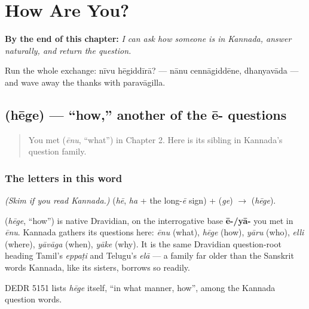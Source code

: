 
\chapter{How Are You?}
\label{ch:responding}

\begin{chapteropening}
\textbf{By the end of this chapter:} \emph{I can ask how someone is in Kannada, answer naturally, and return the question.}

Run the whole exchange: nīvu hēgiddīrā? — nānu cennāgiddēne, dhanyavāda — and wave away the thanks with paravāgilla.
\end{chapteropening}

\section[\texorpdfstring{\kn{ಹೇಗೆ} (hēge)}{ಹೇಗೆ (hēge)}]{ (hēge) — \textquotedblleft{}how,\textquotedblright{} another of the ē- questions}

\label{lesson:KA-C03-hege}



\begin{quote}
You met \textbf{} (\emph{ēnu}, \textquotedblleft{}what\textquotedblright{}) in Chapter 2. Here is its sibling in Kannada's question family.
\end{quote}

\subsection*{The letters in this word}
\emph{(Skim if you read Kannada.)} \textbf{} (\emph{hē}, \emph{ha} + the long-\emph{ē} sign) + \textbf{} (\emph{ge}) $\to$ \textbf{} (\emph{hēge}).

\begin{cousinweb}
\textbf{} (\emph{hēge}, \textquotedblleft{}how\textquotedblright{}) is native Dravidian, on the interrogative base \textbf{ē-/yā-} you met in \emph{ēnu}. Kannada gathers its questions here: \emph{ēnu} (what), \emph{hēge} (how), \emph{yāru} (who), \emph{elli} (where), \emph{yāvāga} (when), \emph{yāke} (why). It is the same Dravidian question-root heading Tamil's \emph{eppaṭi} and Telugu's \emph{elā} — a family far older than the Sanskrit words Kannada, like its sisters, borrows so readily.

DEDR 5151 lists \emph{hēge} itself, \textquotedblleft{}in what manner, how\textquotedblright{}, among the Kannada question words.
\end{cousinweb}

